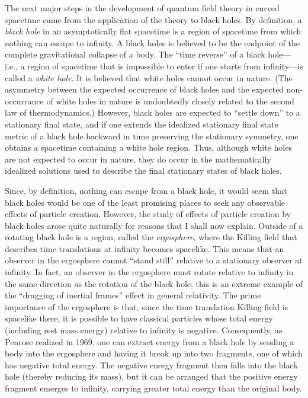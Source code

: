 \documentclass[12pt,epsf,amsfonts,amssymb]{article}
\begin{document}
The next major steps in the development of quantum field theory in
curved spacetime came from the application of the theory to black
holes.  By definition, a {\it black hole} in an asymptotically flat
spacetime is a region of spacetime from which nothing can escape to
infinity. A black holes is believed to be the endpoint of the complete
gravitational collapse of a body.  The ``time reverse'' of a black
hole---i.e., a region of spacetime that is impossible to enter if one
starts from infinity---is called a {\it white hole}. It is believed
that white holes cannot occur in nature. (The asymmetry between the
expected occurrence of black holes and the expected non-occurrance of white
holes in nature is undoubtedly closely related to the second law of
thermodynamics.)  However, black holes are expected to ``settle down''
to a stationary final state, and if one extends the idealized
stationary final state metric of a black hole backward in time
preserving the stationary symmetry, one obtains a spacetime containing a
white hole region. Thus, although white holes are not expected to
occur in nature, they do occur in the mathematically idealized
solutions used to describe the final stationary states of black holes.

Since, by definition, nothing can escape from a black hole, it would
seem that black holes would be one of the least promising places to
seek any observable effects of particle creation. However, the study
of effects of particle creation by black holes arose quite naturally
for reasons that I shall now explain. Outside of a rotating black
hole is a region, called the {\it ergosphere}, where the Killing field
that describes time translations at infinity becomes spacelike. This
means that an observer in the ergosphere cannot ``stand still''
relative to a stationary observer at infinity. In fact, an observer in
the ergosphere must rotate relative to infinity in the same direction
as the rotation of the black hole; this is an extreme example of the
``dragging of inertial frames'' effect in general relativity. The
prime importance of the ergosphere is that, since the time translation
Killing field is spacelike there, it is possible to have classical
particles whose total energy (including rest mass energy) relative to
infinity is negative. Consequently, as Penrose realized in 1969, one
can extract energy from a black hole by sending a body into the
ergosphere and having it break up into two fragments, one of which has
negative total energy. The negative energy fragment then falls into
the black hole (thereby reducing its mass), but it can be arranged
that the positive energy fragment emerges to infinity, carrying
greater total energy than the original body.
\end{document}
